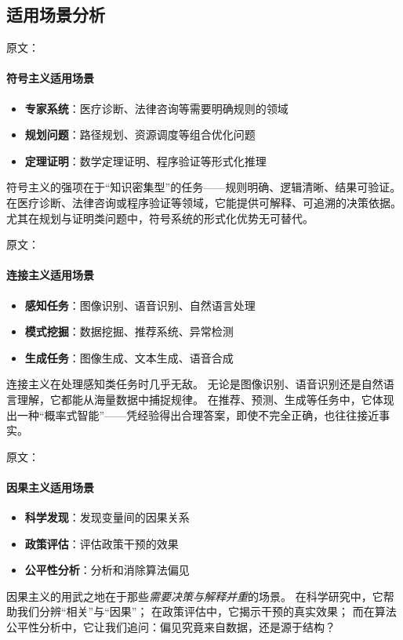 \subsection{适用场景分析}

原文：
\paragraph{符号主义适用场景}
\begin{itemize}
\item \textbf{专家系统}：医疗诊断、法律咨询等需要明确规则的领域
\item \textbf{规划问题}：路径规划、资源调度等组合优化问题
\item \textbf{定理证明}：数学定理证明、程序验证等形式化推理
\end{itemize}
符号主义的强项在于“知识密集型”的任务——规则明确、逻辑清晰、结果可验证。  
在医疗诊断、法律咨询或程序验证等领域，它能提供可解释、可追溯的决策依据。  
尤其在规划与证明类问题中，符号系统的形式化优势无可替代。

原文：
\paragraph{连接主义适用场景}
\begin{itemize}
\item \textbf{感知任务}：图像识别、语音识别、自然语言处理
\item \textbf{模式挖掘}：数据挖掘、推荐系统、异常检测
\item \textbf{生成任务}：图像生成、文本生成、语音合成
\end{itemize}
连接主义在处理感知类任务时几乎无敌。  
无论是图像识别、语音识别还是自然语言理解，它都能从海量数据中捕捉规律。  
在推荐、预测、生成等任务中，它体现出一种“概率式智能”——凭经验得出合理答案，即使不完全正确，也往往接近事实。

原文：
\paragraph{因果主义适用场景}
\begin{itemize}
\item \textbf{科学发现}：发现变量间的因果关系
\item \textbf{政策评估}：评估政策干预的效果
\item \textbf{公平性分析}：分析和消除算法偏见
\end{itemize}
因果主义的用武之地在于那些\emph{需要决策与解释并重}的场景。  
在科学研究中，它帮助我们分辨“相关”与“因果”；  
在政策评估中，它揭示干预的真实效果；  
而在算法公平性分析中，它让我们追问：偏见究竟来自数据，还是源于结构？  



